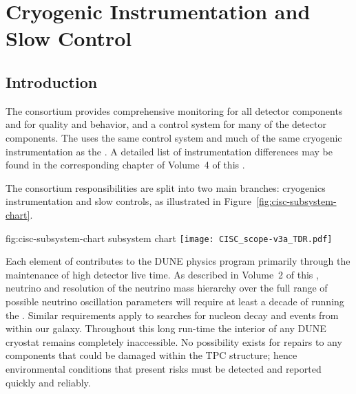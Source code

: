 \chapter{Cryogenic Instrumentation and Slow Control}
\label{ch:sp-cisc}

\section{Introduction} 


The  consortium provides comprehensive monitoring for all detector  components and for \lar quality and behavior, and a control system for many of the detector components. %
The  uses the same control system and much of the same cryogenic instrumentation as the . A detailed list of instrumentation differences may be found in the corresponding chapter of Volume~4 of this . 

The consortium responsibilities are split into 
two main branches: cryogenics instrumentation and slow controls, as illustrated in  Figure~\ref{fig:cisc-subsystem-chart}. %

\begin{dunefigure}{fig:cisc-subsystem-chart}
  { subsystem chart}
  \texttt{[image: CISC\_scope-v3a\_TDR.pdf]}
\end{dunefigure}


Each element of  contributes to the DUNE physics program primarily through the maintenance of high detector live time.  As described in Volume~2 of this , neutrino  and resolution of the neutrino mass hierarchy over the full range of possible neutrino oscillation parameters will require at least a decade of running the .  Similar requirements apply to searches for nucleon decay and  events from within our galaxy.  Throughout this long run-time the interior of any DUNE cryostat remains completely inaccessible.  No possibility exists for repairs to any components that could be damaged within the TPC structure; hence environmental conditions that present risks must be detected and reported quickly and reliably. 
 
